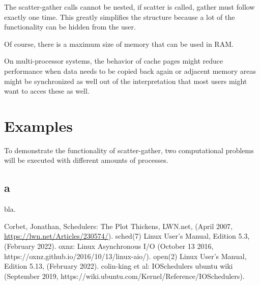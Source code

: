 \documentclass[a4paper]{article}
\begin{document}
The scatter-gather calls cannot be nested, if scatter is called, gather must follow exactly one time. This greatly simplifies the structure because a lot of the functionality can be hidden from the user. 

Of course, there is a maximum size of memory that can be used in RAM.

On multi-processor systems, the behavior of cache pages might reduce performance when data needs to be copied back again or adjacent memory areas might be synchronized as well out of the interpretation that most users might want to acces these as well. 

\section{Examples}

To demonstrate the functionality of scatter-gather, two computational problems will be executed with different amounts of processes. 

\subsection{a}
bla.



\begin{thebibliography}{99}
	 Corbet, Jonathan, Schedulers: The Plot Thickens, LWN.net, (April 2007, \href{https://lwn.net/Articles/230574/}{https://lwn.net/Articles/230574/}).
	 sched(7) Linux User's Manual, Edition 5.3, (February 2022).
     oxnz: Linux Asynchronous I/O (October 13 2016, https://oxnz.github.io/2016/10/13/linux-aio/).
     open(2) Linux User's Manual, Edition 5.13, (February 2022).
     colin-king et al: IOSchedulers ubuntu wiki (September 2019, https://wiki.ubuntu.com/Kernel/Reference/IOSchedulers).
\end{thebibliography}
\end{document}
